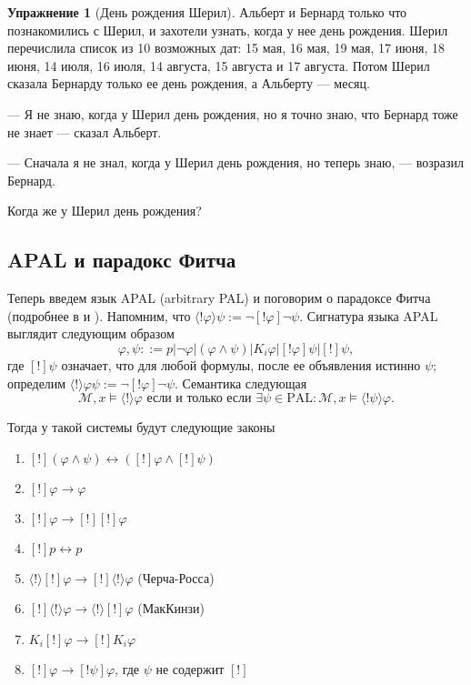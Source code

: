 \documentclass[openany]{book}
\theoremstyle{plain}
\theoremstyle{definition}
\newtheorem{xrc}{Упражнение}[]
\begin{document}
\begin{xrc}[День рождения Шерил]
    Альберт и Бернард только что познакомились с Шерил, и захотели узнать, когда у нее день рождения. Шерил перечислила список из 10 возможных дат: 15 мая, 16 мая, 19 мая, 17 июня, 18 июня, 14 июля, 16 июля, 14 августа, 15 августа и 17 августа. Потом Шерил сказала Бернарду только ее день рождения, а Альберту --- месяц.

    --- Я не знаю, когда у Шерил день рождения, но я точно знаю, что Бернард тоже не знает --- сказал Альберт.

    --- Сначала я не знал, когда у Шерил день рождения, но теперь знаю, --- возразил Бернард.

    Когда же у Шерил день рождения?

\end{xrc}

\subsection{APAL и парадокс Фитча}

Теперь введем язык APAL (arbitrary PAL) и поговорим о парадоксе Фитча (подробнее в \cite{Benthem} и \cite{Balbiani}). Напомним, что \(\langle !\varphi \rangle \psi := \neg [!\varphi] \neg \psi\). Сигнатура языка APAL выглядит следующим образом \[\varphi, \psi ::= p | \neg \varphi | (\varphi \land \psi) | K_i \varphi | [!\varphi] \psi | [!] \psi, \] где \([!]\psi\) означает, что для любой формулы, после ее объявления истинно \(\psi\); определим \(\langle ! \rangle \varphi \psi:= \neg [!\varphi] \neg \psi\). Семантика следующая \[\mathcal{M}, x \models \langle ! \rangle \varphi \text{ если и только если } \exists \psi \in \mathrm{PAL} : \mathcal{M}, x \models \langle ! \psi \rangle \varphi.\]

Тогда у такой системы будут следующие законы
\begin{enumerate}
    \item \([!](\varphi \land \psi) \leftrightarrow ([!] \varphi \land [!] \psi)\)
    \item \([!] \varphi \to \varphi\)
    \item \([!] \varphi \to [!][!] \varphi\)
    \item \([!]p \leftrightarrow p\)
    \item \(\langle ! \rangle [!] \varphi \to [!] \langle ! \rangle \varphi\) (Черча-Росса)
    \item \([!] \langle ! \rangle \varphi \to \langle ! \rangle [!] \varphi\) (МакКинзи)
    \item \(K_i [!] \varphi \to [!] K_i \varphi\)
    \item \([!] \varphi \to [! \psi] \varphi\), где \(\psi\) не содержит \([!]\)
\end{enumerate}
\end{document}
